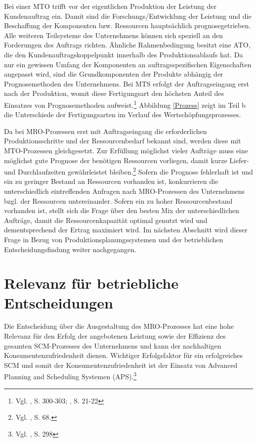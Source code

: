 Bei einer MTO trifft vor der eigentlichen Produktion der Leistung der Kundenauftrag ein. Damit sind die Forschungs/Entwicklung der Leistung und die Beschaffung der Komponenten bzw. Ressourcen hauptsächlich prognosegetrieben. Alle weiteren Teilsysteme des Unternehmens können sich speziell an den Forderungen des Auftrags richten. Ähnliche Rahmenbedingung besitzt eine ATO, die den Kundenauftragskoppelpunkt innerhalb des Produktionsablaufs hat. Da nur ein gewissen Umfang der Komponenten an auftragsspezifischen Eigenschaften angepasst wird, sind die Grundkomponenten der Produkte abhängig der Prognosemethoden des Unternehmens. Bei MTS erfolgt der Auftragseingang erst nach der Produktion, womit diese Fertigungsart den höchsten Anteil des Einsatzes von Prognosemethoden aufweist.\footnote{Vgl. \cite{fleischmeyr2004codp}, S. 300-303; \cite{quante2009management}, S. 21-22} Abbildung \ref{Prozess} zeigt im Teil b die Unterschiede der Fertigungsarten im Verlauf des Wertschöpfungsprozesses. 

Da bei MRO-Prozessen erst mit Auftragseingang die erforderlichen Produktionsschritte und der Ressourcenbedarf bekannt sind, werden diese mit MTO-Prozessen gleichgesetzt. Zur Erfüllung möglichst vieler Aufträge muss eine möglichst gute Prognose der benötigen Ressourcen vorliegen, damit kurze Liefer- und Durchlaufzeiten gewährleistet bleiben.\footnote{Vgl. \cite{thaler2001supply}, S. 68.} Sofern die Prognose fehlerhaft ist und ein zu geringer Bestand an Ressourcen vorhanden ist, konkurrieren die unterschiedlich eintreffenden Anfragen nach MRO-Prozessen des Unternehmens bzgl. der Ressourcen untereinander. Sofern ein zu hoher Ressourcenbestand vorhanden ist, stellt sich die Frage über den besten Mix der unterschiedlichen Aufträge, damit die Ressourcenkapazität optimal genutzt wird und dementsprechend der Ertrag maximiert wird. Im nächsten Abschnitt wird dieser Frage in Bezug von Produktionsplanungssystemen und der betrieblichen Entscheidungsfindung weiter nachgegangen.


\section{Relevanz für betriebliche Entscheidungen}

Die Entscheidung über die Ausgestaltung des MRO-Prozesses hat eine hohe Relevanz für den Erfolg der angebotenen Leistung sowie der Effizienz des gesamten SCM-Prozesses des Unternehmens und kann der nachhaltigen Konsumentenzufriedenheit dienen. Wichtiger Erfolgsfaktor für ein erfolgreiches SCM und somit der Konsumentenzufriedenheit ist der Einsatz von Advanced Planning and Scheduling Systemen (APS).\footnote{Vgl. \cite{fleischmeyr2004codp}, S. 298}

